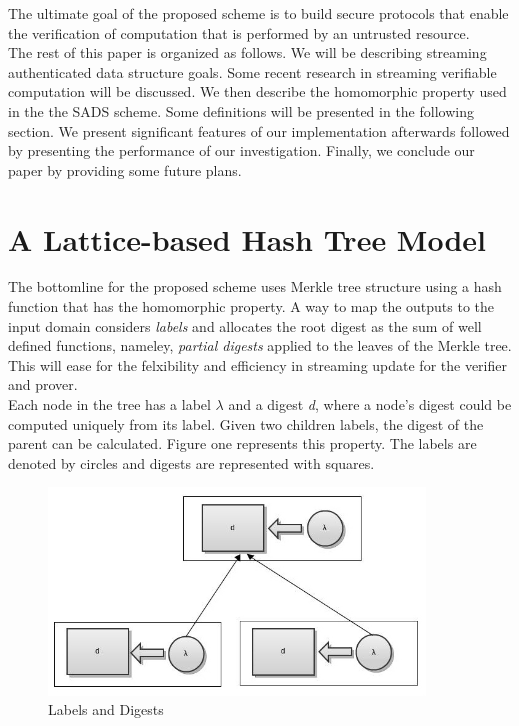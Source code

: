 \documentclass[11pt, letterpaper, oneside]{article}
\begin{document}
	The ultimate goal of the proposed scheme is to build secure protocols that enable the verification of computation
	that is performed by an untrusted resource.\\
		
	The rest of this paper is organized as follows. We will be describing streaming authenticated data structure 
	goals. Some recent research in streaming verifiable computation will be discussed. We then describe the 
	homomorphic property used in the the SADS scheme. Some definitions will be presented in the following section.
	We present significant features of our implementation afterwards followed by presenting the performance of 
	our investigation. Finally, we conclude our paper by providing some future plans.\\
	
	\section{A Lattice-based Hash Tree Model}
	
	The bottomline for the proposed scheme uses Merkle tree structure using a hash function that has the homomorphic
	property. A way to map the outputs to the input domain considers \textit{labels} and allocates the root digest as
	the sum of well defined functions, nameley, \textit{partial digests} applied to the leaves of the Merkle tree.
	This will ease for the felxibility and efficiency in streaming update for the verifier and prover. \\
	
	Each node in the tree has a label $\lambda$ and a digest \textit{d}, where a node's digest
	could be computed uniquely from its label. Given two children labels, the digest of the parent can be 
	calculated. Figure one represents this property. The labels are denoted by circles and digests are 
	represented with squares. \\
	
        \begin{figure}[h]
        \centering
        \includegraphics[width=100mm]{./images/label_digest.jpg}
        \caption[]{Labels and Digests}
        \end{figure}
\end{document}
